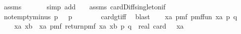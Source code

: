 \begin{isabellebody}
\ assms{\isacharparenleft}{\kern0pt}{}{\isacharparenright}{\kern0pt}\ \isanewline
\ \ \ \ \isamarkupfalse%
\ {\isacharparenleft}{\kern0pt}simp\ add{\isacharcolon}{\kern0pt}\ {\isacartoucheopen}{\isasymK}\ {\isasymnoteq}\ {\isacharbraceleft}{\kern0pt}{\isacharbraceright}{\kern0pt}{\isacartoucheclose}\ assms{\isacharparenleft}{\kern0pt}{}{\isacharparenright}{\kern0pt}\ card{\isacharunderscore}{\kern0pt}Diff{\isacharunderscore}{\kern0pt}singleton{\isacharunderscore}{\kern0pt}if{\isacharparenright}{\kern0pt}\isanewline
\ \ \isamarkupfalse%
\ \isamarkupfalse%
\ not{\isacharunderscore}{\kern0pt}empty{\isacharunderscore}{\kern0pt}minus{\isacharcolon}{\kern0pt}\ {\isachardoublequoteopen}{\isasymAnd}p{\isachardot}{\kern0pt}\ {\isacharparenleft}{\kern0pt}{\isasymK}\ {\isacharminus}{\kern0pt}\ {\isacharbraceleft}{\kern0pt}p{\isacharbraceright}{\kern0pt}{\isacharparenright}{\kern0pt}\ {\isasymnoteq}\ {\isacharbraceleft}{\kern0pt}{\isacharbraceright}{\kern0pt}{\isachardoublequoteclose}\ \isanewline
\ \ \ \isamarkupfalse%
\ card{\isacharunderscore}{\kern0pt}gt{\isacharunderscore}{\kern0pt}{}{\isacharunderscore}{\kern0pt}iff\ \isamarkupfalse%
\ blast\isanewline
\isanewline
\ \ \isamarkupfalse%
\ {\isachardoublequoteopen}{\isacharparenleft}{\kern0pt}{\isasymSum}xa{\isasymin}{\isasymK}{\isachardot}{\kern0pt}\ pmf\ {\isacharparenleft}{\kern0pt}{\isacharquery}{\kern0pt}pmf{\isacharunderscore}{\kern0pt}fun\ xa{\isacharparenright}{\kern0pt}\ {\isacharparenleft}{\kern0pt}p{\isacharcomma}{\kern0pt}\ q{\isacharparenright}{\kern0pt}{\isacharparenright}{\kern0pt}\ {\isacharequal}{\kern0pt}\ \isanewline
\ \ \ \ {\isacharparenleft}{\kern0pt}{\isasymSum}xa{\isasymin}{\isasymK}{\isachardot}{\kern0pt}\ {\isacharparenleft}{\kern0pt}{\isasymSum}xb{\isasymin}{\isacharparenleft}{\kern0pt}{\isasymK}\ {\isacharminus}{\kern0pt}\ {\isacharbraceleft}{\kern0pt}xa{\isacharbraceright}{\kern0pt}{\isacharparenright}{\kern0pt}{\isachardot}{\kern0pt}\ pmf\ {\isacharparenleft}{\kern0pt}return{\isacharunderscore}{\kern0pt}pmf\ {\isacharparenleft}{\kern0pt}xa{\isacharcomma}{\kern0pt}\ xb{\isacharparenright}{\kern0pt}{\isacharparenright}{\kern0pt}\ {\isacharparenleft}{\kern0pt}p{\isacharcomma}{\kern0pt}\ q{\isacharparenright}{\kern0pt}{\isacharparenright}{\kern0pt}\ {\isacharslash}{\kern0pt}\ real\ {\isacharparenleft}{\kern0pt}card\ {\isacharparenleft}{\kern0pt}{\isasymK}\ {\isacharminus}{\kern0pt}\ {\isacharbraceleft}{\kern0pt}xa{\isacharbraceright}{\kern0pt}{\isacharparenright}{\kern0pt}{\isacharparenright}{\kern0pt}{\isacharparenright}{\kern0pt}{\isachardoublequoteclose}\isanewline

\end{isabellebody}
